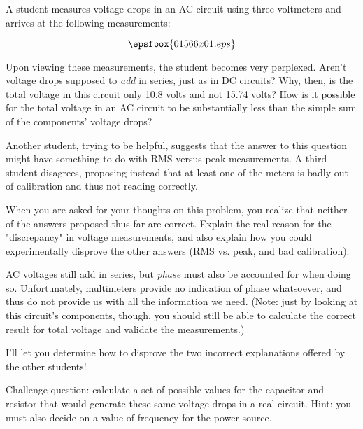 

A student measures voltage drops in an AC circuit using three voltmeters and arrives at the following measurements:

$$\epsfbox{01566x01.eps}$$

Upon viewing these measurements, the student becomes very perplexed.  Aren't voltage drops supposed to {\it add} in series, just as in DC circuits?  Why, then, is the total voltage in this circuit only 10.8 volts and not 15.74 volts?  How is it possible for the total voltage in an AC circuit to be substantially less than the simple sum of the components' voltage drops?

Another student, trying to be helpful, suggests that the answer to this question might have something to do with RMS versus peak measurements.  A third student disagrees, proposing instead that at least one of the meters is badly out of calibration and thus not reading correctly.

When you are asked for your thoughts on this problem, you realize that neither of the answers proposed thus far are correct.  Explain the real reason for the "discrepancy" in voltage measurements, and also explain how you could experimentally disprove the other answers (RMS vs. peak, and bad calibration).







AC voltages still add in series, but {\it phase} must also be accounted for when doing so.  Unfortunately, multimeters provide no indication of phase whatsoever, and thus do not provide us with all the information we need.  (Note: just by looking at this circuit's components, though, you should still be able to calculate the correct result for total voltage and validate the measurements.)

I'll let you determine how to disprove the two incorrect explanations offered by the other students!

\vskip 10pt

Challenge question: calculate a set of possible values for the capacitor and resistor that would generate these same voltage drops in a real circuit.  Hint: you must also decide on a value of frequency for the power source.

